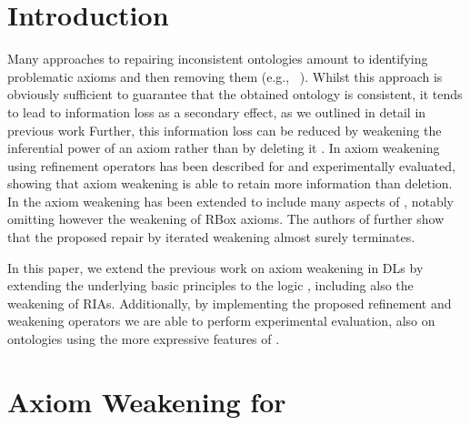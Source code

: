 \documentclass[
]{ceurart}
\begin{document}
\maketitle

\section{Introduction}

Many approaches to repairing inconsistent ontologies amount to identifying problematic axioms and then removing them (e.g., ~\cite{ScCo03,kalyanpur2005debugging,kalyanpur2006repairing,BaPS07}). Whilst this approach is obviously sufficient to guarantee that the obtained ontology is consistent, it tends to lead to information loss as a secondary effect, as we outlined in detail in previous work \cite{troquard2018repairing,confalonieri2020towards}  Further, this information loss can be reduced by weakening the inferential power of an axiom rather than by deleting it \cite{du2014practical,AMAI-2018,DBLP:conf/kr/BaaderKNP18,troquard2018repairing,confalonieri2020towards}. In \cite{troquard2018repairing} axiom weakening using refinement operators has been described for \ALC and experimentally evaluated, showing that axiom weakening is able to retain more information than deletion. In \cite{confalonieri2020towards} the axiom weakening has been extended to include many aspects of \SROIQ, notably omitting however the weakening of RBox axioms. The authors of \cite{confalonieri2020towards} further show that the proposed repair by iterated weakening almost surely terminates.

In this  paper, we extend the previous work on axiom weakening in DLs by extending the underlying basic principles to the logic \SROIQ, including also the weakening of RIAs. Additionally, by implementing the proposed refinement and weakening operators we are able to perform experimental evaluation, also on ontologies using the more expressive features of \SROIQ.

\section{Axiom Weakening for \SROIQ}

\end{document}
